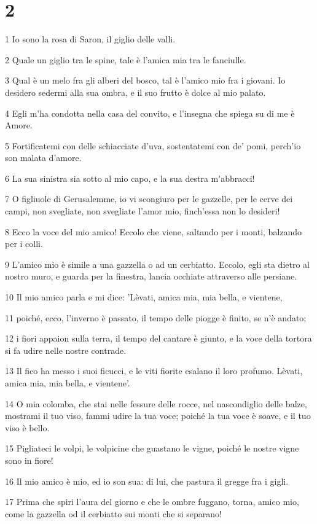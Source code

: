 \chapter{2}

\par 1 Io sono la rosa di Saron, il giglio delle valli.
\par 2 Quale un giglio tra le spine, tale è l'amica mia tra le fanciulle.
\par 3 Qual è un melo fra gli alberi del bosco, tal è l'amico mio fra i giovani. Io desidero sedermi alla sua ombra, e il suo frutto è dolce al mio palato.
\par 4 Egli m'ha condotta nella casa del convito, e l'insegna che spiega su di me è Amore.
\par 5 Fortificatemi con delle schiacciate d'uva, sostentatemi con de' pomi, perch'io son malata d'amore.
\par 6 La sua sinistra sia sotto al mio capo, e la sua destra m'abbracci!
\par 7 O figliuole di Gerusalemme, io vi scongiuro per le gazzelle, per le cerve dei campi, non svegliate, non svegliate l'amor mio, finch'essa non lo desideri!
\par 8 Ecco la voce del mio amico! Eccolo che viene, saltando per i monti, balzando per i colli.
\par 9 L'amico mio è simile a una gazzella o ad un cerbiatto. Eccolo, egli sta dietro al nostro muro, e guarda per la finestra, lancia occhiate attraverso alle persiane.
\par 10 Il mio amico parla e mi dice: 'Lèvati, amica mia, mia bella, e vientene,
\par 11 poiché, ecco, l'inverno è passato, il tempo delle piogge è finito, se n'è andato;
\par 12 i fiori appaion sulla terra, il tempo del cantare è giunto, e la voce della tortora si fa udire nelle nostre contrade.
\par 13 Il fico ha messo i suoi ficucci, e le viti fiorite esalano il loro profumo. Lèvati, amica mia, mia bella, e vientene'.
\par 14 O mia colomba, che stai nelle fessure delle rocce, nel nascondiglio delle balze, mostrami il tuo viso, fammi udire la tua voce; poiché la tua voce è soave, e il tuo viso è bello.
\par 15 Pigliateci le volpi, le volpicine che guastano le vigne, poiché le nostre vigne sono in fiore!
\par 16 Il mio amico è mio, ed io son sua: di lui, che pastura il gregge fra i gigli.
\par 17 Prima che spiri l'aura del giorno e che le ombre fuggano, torna, amico mio, come la gazzella od il cerbiatto sui monti che si separano!


